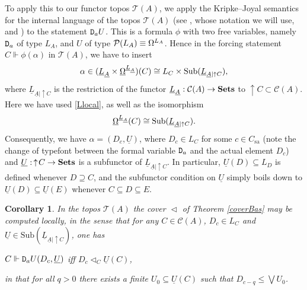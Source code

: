 \documentclass[12pt]{article}
\newcommand{\drie}{\vartriangleleft}
\newcommand{\beq}{\begin{equation}}
\newcommand{\eeq}{\end{equation}}
\newcommand{\Sets}{\mbox{\textbf{Sets}}}
\newcommand{\raw}{\rightarrow} \newcommand{\rat}{\mapsto}
\newcommand{\x}{\times} \newcommand{\hb}{\hbar}
\newcommand{\er}{\eqref}
\newcommand{\al}{\alpha} \newcommand{\bt}{\beta}
\newcommand{\CA}{{\mathcal A}} \newcommand{\CB}{{\mathcal B}}
\newcommand{\alg}[1]{\ensuremath{#1}}
\newcommand{\context}{\ensuremath{\mathcal{C}}}
\newcommand{\asstopos}{\ensuremath{\mathcal{T}}}
\newcommand{\sa}{\ensuremath{_{\mathrm{sa}}}}
\newcommand{\prop}[1]{\ensuremath{\mbox{\texttt{#1}}}}
\newcommand{\uA}{\underline{A}}
\renewcommand{\CA}{\mathcal{C}(A)}
\newcommand{\TA}{\mathcal{T}(A)}
\renewcommand{\TA}{\asstopos(\alg{A})}
\renewcommand{\CA}{\context(\alg{A})}
\newtheorem{corollary}[theorem]{Corollary}
\begin{document}
To apply this to our functor topos $\TA$, we apply  the Kripke--Joyal semantics for the internal language of the topos $\TA$ (see \cite[\S VI.7]{maclanemoerdijk92}, whose notation we will use, and \cite[\S 6.6]{borceux3}) to the  statement 
$\prop{D}_a \drie U$. This is a formula $\phi$ with two free variables, namely $\prop{D}_a$ 
 of type $L_A$, and $U$ of type ${\mathcal P}(L_A)\equiv \Omega^{L_A}$. Hence in the forcing statement 
 $C\Vdash \phi(\al)$ in $\TA$, we have to insert
 $$ \al\in (\underline{L}_{\uA}\x \underline{\Om}^{\underline{L}_{\uA}})(C)\cong L_C\x \mathrm{Sub}(\underline{L}_{\uA|\uparrow C}),$$
 where $\underline{L}_{\uA|\uparrow C}$ is the restriction of the functor $\underline{L}_{\uA}:\CA\raw\Sets$ to $\uparrow\!C\subset\CA$.
 Here we have used \er{Llocal}, as well as  the isomorphism  \cite[\S II.8]{maclanemoerdijk92}
 \beq \underline{\Om}^{\underline{L}_{\uA}}(C)\cong\mathrm{Sub}(\underline{L}_{\uA|\uparrow C}).
 \label{Yoneda}
 \eeq
 Consequently, we have $\al=(D_c,\underline{U})$, where $D_c\in L_C$ for some $c\in C\sa$ (note the change of typefont between the formal variable
 $\prop{D}_a$ and the actual element $D_c$) and $\underline{U}:\, \uparrow\!C\raw\Sets$ is a subfunctor of 
 $\underline{L}_{\uA|\uparrow C}$. In particular, $\underline{U}(D)\subseteq L_D$ is defined whenever $D\supseteq C$, and
 the subfunctor condition on $\underline{U}$ simply boils down to $\underline{U}(D)\subseteq \underline{U}(E)$
 whenever $C\subseteq D\subseteq E$.
\begin{corollary}\label{coverBas2}
In the topos $\TA$  the cover $\drie$ of Theorem \ref{coverBas} may be computed locally, in the sense that  for any 
$C\in \CA$, $D_c\in L_C$ and $\underline{U}\in \mathrm{Sub}(\underline{L}_{\uA|\uparrow C})$,
one has\begin{center}
$C\Vdash \prop{D}_a \drie {U}(D_c,\underline{U})$ iff  $D_c \drie_C \underline{U}(C)$,
\end{center}
in that for all  $q>0$ there exists a finite $U_0\subseteq \underline{U}(C)$ such that ${D}_{c-q}\leqslant\bigvee U_0$.
  \end{corollary}  
\end{document}
